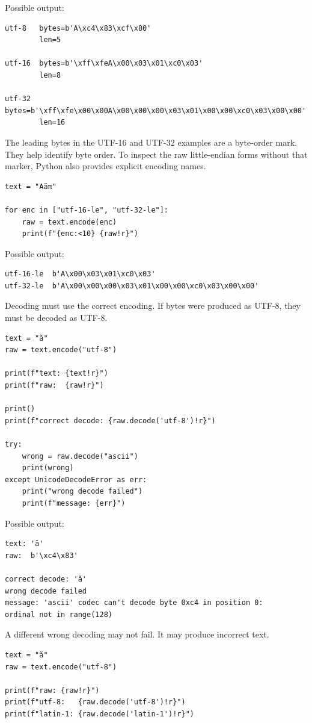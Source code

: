 Possible output:

\begin{verbatim}
utf-8   bytes=b'A\xc4\x83\xcf\x80'
        len=5

utf-16  bytes=b'\xff\xfeA\x00\x03\x01\xc0\x03'
        len=8

utf-32  bytes=b'\xff\xfe\x00\x00A\x00\x00\x00\x03\x01\x00\x00\xc0\x03\x00\x00'
        len=16
\end{verbatim}

The leading bytes in the UTF-16 and UTF-32 examples are a byte-order mark. They help identify byte order. To inspect the raw little-endian forms without that marker, Python also provides explicit encoding names.

\begin{verbatim}
text = "Aăπ"

for enc in ["utf-16-le", "utf-32-le"]:
    raw = text.encode(enc)
    print(f"{enc:<10} {raw!r}")
\end{verbatim}

Possible output:

\begin{verbatim}
utf-16-le  b'A\x00\x03\x01\xc0\x03'
utf-32-le  b'A\x00\x00\x00\x03\x01\x00\x00\xc0\x03\x00\x00'
\end{verbatim}

Decoding must use the correct encoding. If bytes were produced as UTF-8, they must be decoded as UTF-8.

\begin{verbatim}
text = "ă"
raw = text.encode("utf-8")

print(f"text: {text!r}")
print(f"raw:  {raw!r}")

print()
print(f"correct decode: {raw.decode('utf-8')!r}")

try:
    wrong = raw.decode("ascii")
    print(wrong)
except UnicodeDecodeError as err:
    print("wrong decode failed")
    print(f"message: {err}")
\end{verbatim}

Possible output:

\begin{verbatim}
text: 'ă'
raw:  b'\xc4\x83'

correct decode: 'ă'
wrong decode failed
message: 'ascii' codec can't decode byte 0xc4 in position 0:
ordinal not in range(128)
\end{verbatim}

A different wrong decoding may not fail. It may produce incorrect text.

\begin{verbatim}
text = "ă"
raw = text.encode("utf-8")

print(f"raw: {raw!r}")
print(f"utf-8:   {raw.decode('utf-8')!r}")
print(f"latin-1: {raw.decode('latin-1')!r}")
\end{verbatim}

